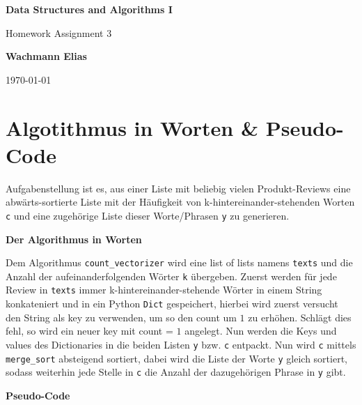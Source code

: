 \documentclass[ngerman]{scrartcl}
\newcommand{\code}{\texttt}
\begin{document}
\begin{titlepage}
    \begin{center}
        \vspace{1cm}
        \Huge
        \textbf{Data Structures and Algorithms I}
        \vspace{5mm}

        \Large
        Homework Assignment 3
        \vspace{5mm}


        \textbf{Wachmann Elias}


        \today
    \end{center}
\end{titlepage}

\clearpage
\tableofcontents
\newpage

\section{Algotithmus in Worten \& Pseudo-Code}
\label{sec:pseudo_code}
Aufgabenstellung ist es, aus einer Liste mit beliebig vielen Produkt-Reviews eine abwärts-sortierte Liste mit der Häufigkeit von k-hintereinander-stehenden Worten \code{c} und eine zugehörige Liste dieser Worte/Phrasen \code{y} zu generieren. 

\textbf{Der Algorithmus in Worten}

Dem Algorithmus \code{count\_vectorizer} wird eine list of lists namens \code{texts} und die Anzahl der aufeinanderfolgenden Wörter \code{k} übergeben.
Zuerst werden für jede Review in \code{texts} immer k-hintereinander-stehende Wörter in einem String konkateniert und in ein Python \code{Dict} gespeichert, hierbei wird zuerst versucht den String als key zu verwenden, um so den count um $1$ zu erhöhen. Schlägt dies fehl, so wird ein neuer key mit count = $1$ angelegt. Nun werden die Keys und values des Dictionaries in die beiden Listen \code{y} bzw. \code{c} entpackt. Nun wird \code{c} mittels \code{merge\_sort} absteigend sortiert, dabei wird die Liste der Worte \code{y} gleich sortiert, sodass weiterhin jede Stelle in \code{c} die Anzahl der dazugehörigen Phrase in \code{y} gibt.

\textbf{Pseudo-Code}
\end{document}
